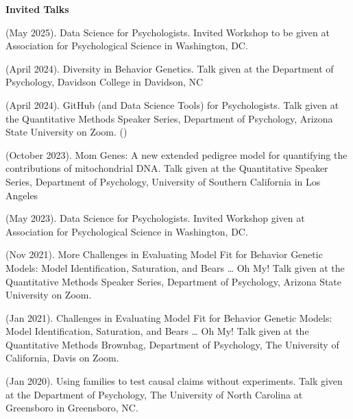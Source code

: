 {\large {\bf Invited Talks}}\begin{etaremune}
\item\meb (May 2025). Data Science for Psychologists. Invited Workshop to be given at Association for Psychological Science in Washington, DC.

\item\meb (April 2024). Diversity in Behavior Genetics. Talk given at the Department of Psychology, Davidson College in Davidson, NC 
%
\item\meb (April 2024). GitHub (and Data Science Tools) for Psychologists. Talk given at the Quantitative Methods Speaker Series, Department of Psychology, Arizona State University on Zoom. ()
%
\item\meb (October 2023). Mom Genes: A new extended pedigree model for quantifying the contributions of mitochondrial DNA. Talk given at the Quantitative Speaker Series, Department of Psychology, University of Southern California in Los Angeles
\item\meb (May 2023). Data Science for Psychologists. Invited Workshop given at Association for Psychological Science in Washington, DC.
\item\meb (Nov 2021). More Challenges in Evaluating Model Fit for Behavior Genetic Models: Model Identification, Saturation, and Bears … Oh My! Talk given at the Quantitative Methods Speaker Series, Department of Psychology, Arizona State University on Zoom.
%
\item\meb (Jan 2021). Challenges in Evaluating Model Fit for Behavior Genetic Models: Model Identification, Saturation, and Bears … Oh My! Talk given at the Quantitative Methods Brownbag, Department of Psychology, The University of California, Davis on Zoom.
%
\item\meb (Jan 2020). Using families to test causal claims without experiments. Talk given at the Department of Psychology, The University of North Carolina at Greensboro in Greensboro, NC.
%

\end{etaremune}
